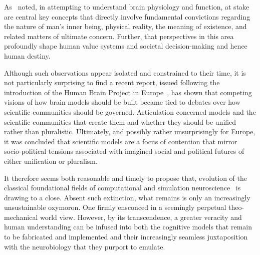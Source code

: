 \documentclass[11pt,3p,twocolumn]{JMN}
\begin{document}
As~\citet{sperry80} noted, in attempting to understand brain physiology and function, at stake are central key concepts that directly involve fundamental convictions regarding the nature of man's inner being, physical reality, the meaning of existence, and related matters of ultimate concern. Further, that perspectives in this area profoundly shape human value systems and societal decision-making and hence human destiny.

Although such observations appear isolated and constrained to their time, it is not particularly surprising to find a recent report, issued following the introduction of the Human Brain Project in Europe~\citep{mahfoud21}, has shown that competing visions of how brain models should be built became tied to debates over how scientific communities should be governed. Articulation concerned models and the scientific communities that create them and whether they should be unified rather than pluralistic. Ultimately, and possibly rather unsurprisingly for Europe, it was concluded that scientific models are a focus of contention that mirror socio-political tensions associated with imagined social and political futures of either unification or pluralism.

It therefore seems both reasonable and timely to propose that, evolution of the classical foundational fields of computational and simulation neuroscience~\citep[see][]{fan19} is drawing to a close. Absent such extinction, what remains is only an increasingly unsustainable oxymoron. One firmly ensconced in a seemingly perpetual theo-mechanical world view. However, by its transcendence, a greater veracity and human understanding can be infused into both the cognitive models that remain to be fabricated and implemented and their increasingly seamless juxtaposition with the neurobiology that they purport to emulate. 

\end{document}
